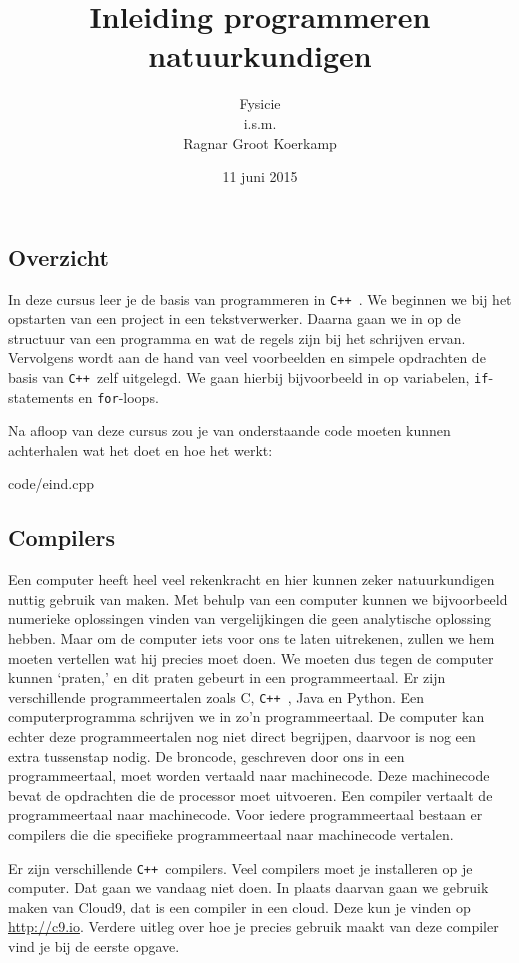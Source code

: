 \documentclass[12pt,a4paper]{article}
\title{Inleiding programmeren natuurkundigen}
\author{
Fysicie\\
i.s.m.\\
Ragnar Groot Koerkamp
}
\date{11 juni 2015}
\newcommand{\code}{}
\newcommand{\icode}{\lstinline}
\newcommand{\mono}{\texttt}
\newcommand{\cpp}{\mono{C++ }}
\begin{document}
 
\maketitle

\tableofcontents

\clearpage
\subsection{Overzicht}
In deze cursus leer je de basis van programmeren in \cpp. We beginnen we bij het opstarten van een project in een tekstverwerker. Daarna gaan we in op de structuur van een programma en wat de regels zijn bij het schrijven ervan. Vervolgens wordt aan de hand van veel voorbeelden en simpele opdrachten de basis van \cpp zelf	 uitgelegd. We gaan hierbij bijvoorbeeld in op variabelen, \icode{if}-statements en \icode{for}-loops.

Na afloop van deze cursus zou je van onderstaande code moeten kunnen achterhalen wat het doet en hoe het werkt:

\code{code/eind.cpp}
\subsection{Compilers}
Een computer heeft heel veel rekenkracht en hier kunnen zeker natuurkundigen nuttig gebruik van maken. Met behulp van een computer kunnen we bijvoorbeeld numerieke oplossingen vinden van vergelijkingen die geen analytische oplossing hebben. Maar om de computer iets voor ons te laten uitrekenen, zullen we hem moeten vertellen wat hij precies moet doen. We moeten dus tegen de computer kunnen `praten,' en dit praten gebeurt in een programmeertaal. Er zijn verschillende programmeertalen zoals C, \cpp, Java en Python. Een computerprogramma schrijven we in zo'n programmeertaal. De computer kan echter deze programmeertalen nog niet direct begrijpen, daarvoor is nog een extra tussenstap nodig. De broncode, geschreven door ons in een programmeertaal, moet worden vertaald naar machinecode. Deze machinecode bevat de opdrachten die de processor moet uitvoeren. Een compiler vertaalt de programmeertaal naar machinecode. Voor iedere programmeertaal bestaan er compilers die die specifieke programmeertaal naar machinecode vertalen.

Er zijn verschillende \cpp compilers. Veel compilers moet je installeren op je computer. Dat gaan we vandaag niet doen. In plaats daarvan gaan we gebruik maken van Cloud9, dat is een compiler in een cloud. Deze kun je vinden op \url{http://c9.io}. Verdere uitleg over hoe je precies gebruik maakt van deze compiler vind je bij de eerste opgave.
\end{document}
